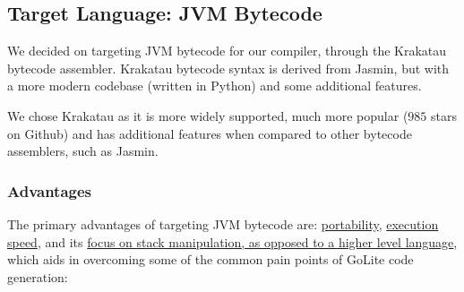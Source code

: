\documentclass[11pt]{article}
\begin{document}

\subsection{Target Language: JVM Bytecode}
We decided on targeting JVM bytecode for our compiler, through the
Krakatau\cite{krakatau} bytecode
assembler. Krakatau bytecode syntax is derived from Jasmin, but with a
more modern codebase (written in Python) and some additional features.

We chose Krakatau as it is more widely supported, much more popular
($985$ stars on Github\cite{krakatau}) and has additional features
when compared to other bytecode assemblers, such as Jasmin.
\subsubsection{Advantages}
The primary advantages of targeting JVM bytecode are:
\hyperref[sec:portability]{portability},
\hyperref[sec:execs]{execution speed}, and its
\hyperref[sec:stack]{focus on stack manipulation, as opposed to a
  higher level language}, which aids in overcoming some of the common
pain points of GoLite code generation:
\end{document}
